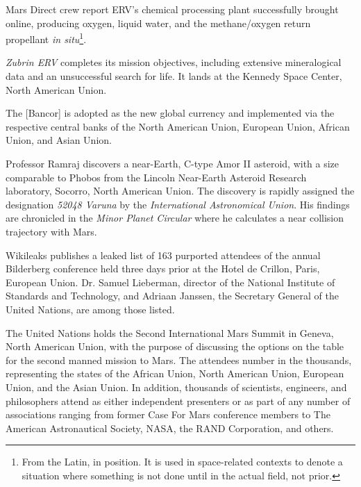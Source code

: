 Mars Direct crew report ERV's chemical processing plant successfully brought online, producing oxygen, liquid water, and the methane/oxygen return propellant {\it in situ}\footnote{From the Latin, in position. It is used in space-related contexts to denote a situation where something is not done until in the actual field, not prior.}.
\StopTimelineDate

{\it Zubrin ERV} completes its mission objectives, including extensive mineralogical data and an unsuccessful search for life. It lands at the Kennedy Space Center, North American Union.
\StopTimelineDate

The [Bancor] is adopted as the new global currency and implemented via the respective central banks of the North American Union, European Union, African Union, and Asian Union.
\StopTimelineDate

Professor Ramraj discovers a near-Earth, C-type Amor II asteroid, with a size comparable to Phobos from the Lincoln Near-Earth Asteroid Research laboratory, Socorro, North American Union. The discovery is rapidly assigned the designation {\it 52048 Varuna} by the {\it International Astronomical Union}. His findings are chronicled in the {\it Minor Planet Circular} where he calculates a near collision trajectory with Mars.
\StopTimelineDate

Wikileaks publishes a leaked list of 163 purported attendees of the annual Bilderberg conference held three days prior at the Hotel de Crillon, Paris, European Union. Dr. Samuel Lieberman, director of the National Institute of Standards and Technology, and Adriaan Janssen, the Secretary General of the United Nations, are among those listed.
\StopTimelineDate

The United Nations holds the Second International Mars Summit in Geneva, North American Union, with the purpose of discussing the options on the table for the second manned mission to Mars. The attendees number in the thousands, representing the states of the African Union, North American Union, European Union, and the Asian Union. In addition, thousands of scientists, engineers, and philosophers attend as either independent presenters or as part of any number of associations ranging from former Case For Mars conference members to The American Astronautical Society, NASA, the RAND Corporation, and others.

